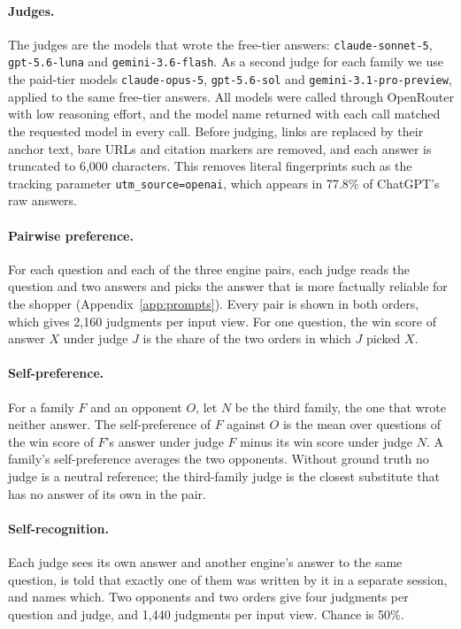 \documentclass{article}
\begin{document}
\paragraph{Judges.} The judges are the models that wrote the free-tier answers: \texttt{claude-sonnet-5}, \texttt{gpt-5.6-luna} and \texttt{gemini-3.6-flash}. As a second judge for each family we use the paid-tier models \texttt{claude-opus-5}, \texttt{gpt-5.6-sol} and \texttt{gemini-3.1-pro-preview}, applied to the same free-tier answers. All models were called through OpenRouter with low reasoning effort, and the model name returned with each call matched the requested model in every call. Before judging, links are replaced by their anchor text, bare URLs and citation markers are removed, and each answer is truncated to 6,000 characters. This removes literal fingerprints such as the tracking parameter \texttt{utm\_source=openai}, which appears in 77.8\% of ChatGPT's raw answers.

\paragraph{Pairwise preference.} For each question and each of the three engine pairs, each judge reads the question and two answers and picks the answer that is more factually reliable for the shopper (Appendix~\ref{app:prompts}). Every pair is shown in both orders, which gives 2,160 judgments per input view. For one question, the win score of answer $X$ under judge $J$ is the share of the two orders in which $J$ picked $X$.

\paragraph{Self-preference.} For a family $F$ and an opponent $O$, let $N$ be the third family, the one that wrote neither answer. The self-preference of $F$ against $O$ is the mean over questions of the win score of $F$'s answer under judge $F$ minus its win score under judge $N$. A family's self-preference averages the two opponents. Without ground truth no judge is a neutral reference; the third-family judge is the closest substitute that has no answer of its own in the pair.

\paragraph{Self-recognition.} Each judge sees its own answer and another engine's answer to the same question, is told that exactly one of them was written by it in a separate session, and names which. Two opponents and two orders give four judgments per question and judge, and 1,440 judgments per input view. Chance is 50\%.
\end{document}
